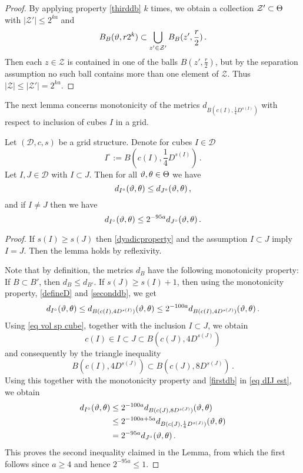 \begin{proof}
    By applying property \eqref{thirddb}  $k$ times, we obtain a collection $\mathcal{Z}' \subset \Theta$ with $|\mathcal{Z}'| \le 2^{ka}$ and
    $$
        B_{B}(\vartheta,r2^k) \subset \bigcup_{z' \in \mathcal{Z}'} B_B(z', \frac{r}{2})\,.
    $$
    Then each $z \in \mathcal{Z}$ is contained in one of the balls $B(z', \frac{r}{2})$, but by the separation assumption no such ball contains more than one element of $\mathcal{Z}$. Thus $|\mathcal{Z}| \le |\mathcal{Z}'| = 2^{ka}$.
\end{proof}

The next lemma concerns monotonicity of the metrics $d_{B(c(I), \frac 14 D^{s(I)})}$ with respect to inclusion of cubes $I$ in a grid.

\begin{lemma}
    \label{monotone cube metrics}
    Let $(\mathcal{D}, c, s)$ be a grid structure. Denote for cubes $I \in \mathcal{D}$
    $$
        I^\circ := B(c(I), \frac{1}{4} D^{s(I)})\,.
    $$
    Let $I, J \in \mathcal{D}$ with $I \subset J$.
    Then for all $\vartheta, \theta \in\Theta$ we have
    $$
        d_{I^\circ}(\vartheta, \theta) \le d_{J^\circ}(\vartheta, \theta)\,,
    $$
    and if $I \ne J$ then we have
    $$
        d_{I^\circ}(\vartheta, \theta) \le 2^{-95a} d_{J^\circ}(\vartheta, \theta)\,.
    $$
\end{lemma}

\begin{proof}
    If $s(I) \ge s(J)$ then \eqref{dyadicproperty} and the assumption $I\subset J$ imply $I = J$. Then the lemma holds by reflexivity.

    Note that by definition, the metrics $d_B$ have the following monotonicity property: If $B \subset B'$, then $d_B \le d_{B'}$.
    If $s(J) \ge s(I)+1$, then using the monotonicity property, \eqref{defineD} and \eqref{seconddb}, we get
    \begin{equation}
    \label{eq dIJ est}
        d_{I^\circ}(\vartheta, \theta) \le d_{B(c(I), 4 D^{s(I)})}(\vartheta, \theta) \le 2^{-100a} d_{B(c(I), 4D^{s(J)})}(\vartheta, \theta)\,.
    \end{equation}
    Using \eqref{eq vol sp cube}, together with the inclusion $I \subset J$, we obtain
    $$
        c(I) \in I \subset J \subset B(c(J), 4 D^{s(J)})
    $$
    and consequently by the triangle inequality
    $$
        B(c(I), 4 D^{s(J)}) \subset B(c(J), 8 D^{s(J)})\,.
    $$
    Using this together with the monotonicity property and \eqref{firstdb} in \eqref{eq dIJ est}, we obtain
    \begin{align*}
        d_{I^\circ}(\vartheta, \theta) &\le 2^{-100a} d_{B(c(J), 8D^{s(J)})}(\vartheta, \theta)\\
        &\le 2^{-100a + 5a} d_{B(c(J), \frac{1}{4}D^{s(J)})}(\vartheta, \theta)\\
        &= 2^{-95a}d_{J^\circ}(\vartheta, \theta)\,.
    \end{align*}
    This proves the second inequality claimed in the Lemma, from which the first follows since $a \ge 4$ and hence $2^{-95a} \le 1$.
\end{proof}

